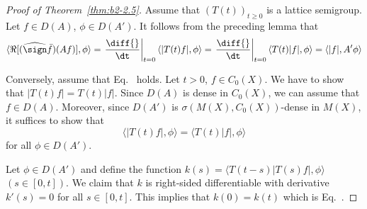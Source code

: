 \begin{proof}[Proof of Theorem~\ref{thm:b2-2.5}]
Assume that $(T(t))_{t \geq 0}$ is a lattice semigroup.
Let $f \in D(A)$, $\phi \in D(A')$.
It follows from the preceding lemma that
\[
\langle \Re[(\widehat{\sign} \bar{f})(Af)],\phi \rangle %
= \left.\frac{\diff{}}{\dt}\right|_{t=0} \langle |T(t)f|,\phi \rangle = \left.\frac{\diff{}}{\dt}\right|_{t=0} \langle T(t)|f|,\phi \rangle 
= \langle |f|,A'\phi \rangle
\]

Conversely, assume that Eq.~ holds.
Let $t > 0$, $f \in C_{0}(X)$.
We have to show that $|T(t)f| = T(t)|f|$.
Since $D(A)$ is dense in $C_{0}(X)$, we can assume that $f \in D(A)$.
Moreover, since $D(A')$ is $\sigma(M(X),C_{0}(X))$-dense in $M(X)$, it suffices to show that
\begin{equation}\label{eq:b2-2.13}
\langle |T(t)f|,\phi \rangle = \langle T(t)|f|,\phi \rangle
\end{equation}
for all $\phi \in D(A')$.

Let $\phi \in D(A')$ and define the function $k(s) = \langle T(t-s)|T(s)f|,\phi \rangle$ $(s \in [0,t])$.
We claim that $k$ is right-sided differentiable with derivative $k'(s) = 0$ for all $s \in [0,t]$.
This implies that $k(0) = k(t)$ which is Eq.~.


\end{proof}
